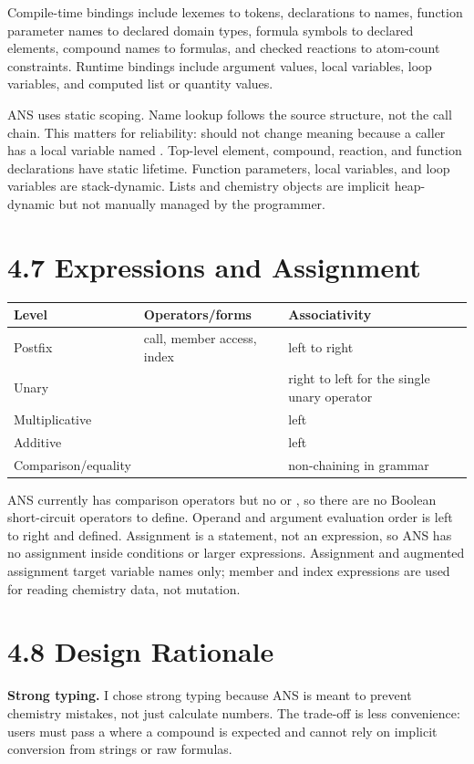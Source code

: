 Compile-time bindings include lexemes to tokens, declarations to names, function parameter names to declared domain types, formula symbols to declared elements, compound names to formulas, and checked reactions to atom-count constraints. Runtime bindings include argument values, local variables, loop variables, and computed list or quantity values.

ANS uses static scoping. Name lookup follows the source structure, not the call chain. This matters for reliability:  should not change meaning because a caller has a local variable named . Top-level element, compound, reaction, and function declarations have static lifetime. Function parameters, local  variables, and loop variables are stack-dynamic. Lists and chemistry objects are implicit heap-dynamic but not manually managed by the programmer.

\newpage
\section{4.7 Expressions and Assignment}
{\footnotesize
\begin{tabularx}{\linewidth}{@{}p{3.5cm}p{3.7cm}Y@{}}
\toprule
Level & Operators/forms & Associativity \\
\midrule
Postfix & call, member access, index & left to right \\
Unary & \code{-} & right to left for the single unary operator \\
Multiplicative & \code{* /} & left \\
Additive & \code{+ -} & left \\
Comparison/equality & \code{< <= > >= == !=} & non-chaining in grammar \\
\bottomrule
\end{tabularx}}

ANS currently has comparison operators but no \code{\&\&} or \code{||}, so there are no Boolean short-circuit operators to define. Operand and argument evaluation order is left to right and defined. Assignment is a statement, not an expression, so ANS has no assignment inside conditions or larger expressions. Assignment and augmented assignment target variable names only; member and index expressions are used for reading chemistry data, not mutation.

\newpage
\section{4.8 Design Rationale}
\textbf{Strong typing.} I chose strong typing because ANS is meant to prevent chemistry mistakes, not just calculate numbers. The trade-off is less convenience: users must pass a  where a compound is expected and cannot rely on implicit conversion from strings or raw formulas.

